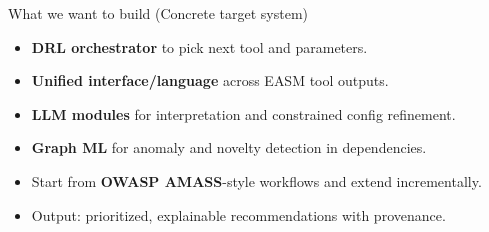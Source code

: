 \documentclass[10pt,aspectratio=169]{beamer}
\begin{document}
\begin{frame}{What we want to build (Concrete target system)}
    \begin{itemize}
        \item \textbf{DRL orchestrator} to pick next tool and parameters.
        \item \textbf{Unified interface/language} across EASM tool outputs.
        \item \textbf{LLM modules} for interpretation and constrained config refinement.
        \item \textbf{Graph ML} for anomaly and novelty detection in dependencies.
        \item Start from \textbf{OWASP AMASS}-style workflows and extend incrementally.
        \item Output: prioritized, explainable recommendations with provenance.
    \end{itemize}
\end{frame}
\end{document}
